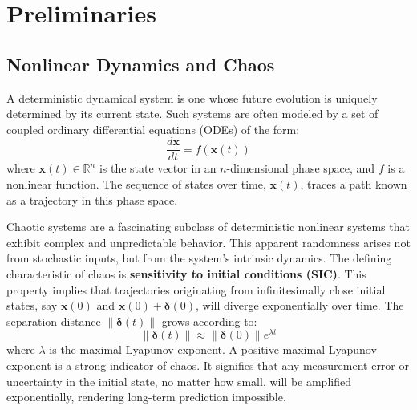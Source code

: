 \documentclass[a4paper,12pt]{article}
\begin{document}
\section{Preliminaries}


\subsection{Nonlinear Dynamics and Chaos}
A deterministic dynamical system is one whose future evolution is uniquely determined by its current state. Such systems are often modeled by a set of coupled ordinary differential equations (ODEs) of the form:
\begin{equation}
    \frac{d\mathbf{x}}{dt} = f(\mathbf{x}(t))
\end{equation}
where $\mathbf{x}(t) \in \mathbb{R}^n$ is the state vector in an $n$-dimensional phase space, and $f$ is a nonlinear function. The sequence of states over time, $\mathbf{x}(t)$, traces a path known as a trajectory in this phase space.

Chaotic systems are a fascinating subclass of deterministic nonlinear systems that exhibit complex and unpredictable behavior. This apparent randomness arises not from stochastic inputs, but from the system's intrinsic dynamics. The defining characteristic of chaos is \textbf{sensitivity to initial conditions (SIC)}. This property implies that trajectories originating from infinitesimally close initial states, say $\mathbf{x}(0)$ and $\mathbf{x}(0) + \bm{\delta}(0)$, will diverge exponentially over time. The separation distance $\|\bm{\delta}(t)\|$ grows according to:
\begin{equation}
    \|\bm{\delta}(t)\| \approx \|\bm{\delta}(0)\| e^{\lambda t}
\end{equation}
where $\lambda$ is the maximal Lyapunov exponent. A positive maximal Lyapunov exponent is a strong indicator of chaos. It signifies that any measurement error or uncertainty in the initial state, no matter how small, will be amplified exponentially, rendering long-term prediction impossible.
\end{document}
